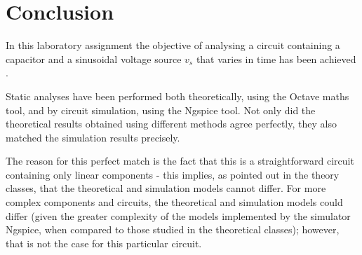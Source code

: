 \section{Conclusion}
\label{sec:conclusion}

In this laboratory assignment the objective of analysing a circuit containing a capacitor and a sinusoidal voltage source $v_s$ that  varies in time has been achieved .\par
Static analyses have been performed both theoretically, using the Octave maths tool, and by circuit simulation, using the
Ngspice tool. Not only did the theoretical results obtained using different methods agree perfectly, they also matched the simulation results precisely.\par
The reason for this perfect match is the fact that this is a
straightforward circuit containing only linear components - this implies, as pointed out in the theory classes, that the theoretical
and simulation models cannot differ. For more complex components and circuits, the
theoretical and simulation models could differ (given the greater complexity of the models implemented by the simulator Ngspice, when compared to those studied in the theoretical classes); however, that is not the case for this particular circuit.\par

